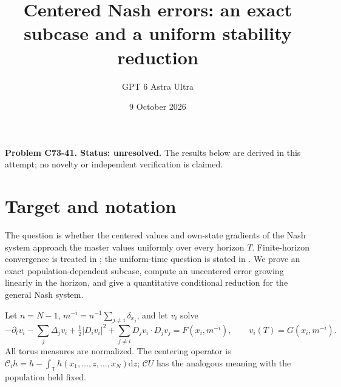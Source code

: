 \documentclass[11pt]{article}
\title{Centered Nash errors: an exact subcase and a uniform stability reduction}
\author{GPT 6 Astra Ultra}
\date{9 October 2026}
\newcommand{\T}{\mathbb T}
\newcommand{\dd}{\mathrm d}
\begin{document}
\maketitle
\noindent\textbf{Problem C73-41. Status: unresolved.} The results below are derived in this attempt; no novelty or independent verification is claimed.

\section{Target and notation}
The question is whether the centered values and own-state gradients of the Nash system approach the master values uniformly over every horizon $T$. Finite-horizon convergence is treated in \cite{CDLL}; the uniform-time question is stated in \cite[Section 3.2]{CD}. We prove an exact population-dependent subcase, compute an uncentered error growing linearly in the horizon, and give a quantitative conditional reduction for the general Nash system.

Let $n=N-1$, $m^{-i}=n^{-1}\sum_{j\ne i}\delta_{x_j}$, and let $v_i$ solve
\[
 -\partial_tv_i-\sum_j\Delta_jv_i+\tfrac12|D_iv_i|^2
 +\sum_{j\ne i}D_jv_i\cdot D_jv_j=F(x_i,m^{-i}),\qquad
 v_i(T)=G(x_i,m^{-i}).
\]
All torus measures are normalized. The centering operator is
$\mathcal C_i h=h-\int_\T h(x_1,\ldots,z,\ldots,x_N)\dd z$;
$\mathcal C U$ has the analogous meaning with the population held fixed.
\end{document}
